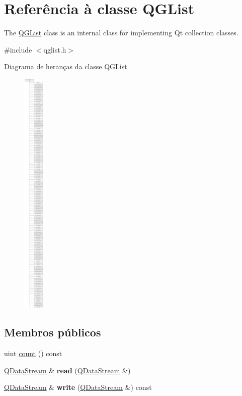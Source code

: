 \hypertarget{class_q_g_list}{\section{Referência à classe Q\-G\-List}
\label{class_q_g_list}
}


The \hyperlink{class_q_g_list}{Q\-G\-List} class is an internal class for implementing Qt collection classes.  




{\ttfamily \#include $<$qglist.\-h$>$}

Diagrama de heranças da classe Q\-G\-List\begin{figure}[H]
\begin{center}
\leavevmode
\includegraphics[height=12.000000cm]{class_q_g_list}
\end{center}
\end{figure}
\subsection*{Membros públicos}
\begin{DoxyCompactItemize}
\item 
uint \hyperlink{class_q_g_list_a774149fc271ebaba2aabcd183a836e8f}{count} () const 
\item 
\hypertarget{class_q_g_list_ab142b2e34eff3c5158dc9e9b629ac619}{\hyperlink{class_q_data_stream}{Q\-Data\-Stream} \& {\bfseries read} (\hyperlink{class_q_data_stream}{Q\-Data\-Stream} \&)}\label{class_q_g_list_ab142b2e34eff3c5158dc9e9b629ac619}

\item 
\hypertarget{class_q_g_list_a25d3618c02fcc4a8e4fde96b131d5348}{\hyperlink{class_q_data_stream}{Q\-Data\-Stream} \& {\bfseries write} (\hyperlink{class_q_data_stream}{Q\-Data\-Stream} \&) const }\label{class_q_g_list_a25d3618c02fcc4a8e4fde96b131d5348}

\end{DoxyCompactItemize}
